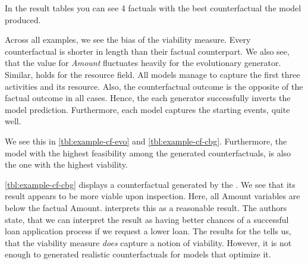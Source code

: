 \documentclass[./../../paper.tex]{subfiles}
\begin{document}
In the result tables you can see 4 factuals with the best counterfactual the model produced. 



% 



% 

Across all examples, we see the bias of the viability measure. Every counterfactual is shorter in length than their factual counterpart. 
We also see, that the value for \emph{Amount} fluctuates heavily for the evolutionary generator.  
Similar, holds for the resource field. All models manage to capture the first three activities and its resource. Also, the counterfactual outcome is the opposite of the factual outcome in all cases. Hence, the each generator successfully inverts the model prediction. Furthermore, each model captures the starting events, quite well.

We see this in \autoref{tbl:example-cf-evo} and \autoref{tbl:example-cf-cbg}. 
Furthermore, the model with the highest feasibility among the \ModelEVO generated counterfactuals, is also the one with the highest viability. 

\autoref{tbl:example-cf-cbg} displays a counterfactual generated by the \ModelCBG. We see that its result appears to be more viable upon inspection. Here, all Amount variables are below the factual Amount. \citeauthor{hsieh_DiCE4ELInterpretingProcess_2021} interprets this as a reasonable result. The authors state, that we can interpret the result as having better chances of a successful loan application process if we request a lower loan. The results for the \ModelCBG tells us, that the viability measure \emph{does} capture a notion of viability. However, it is not enough to generated realistic counterfactuals for models that optimize it. 



\end{document}
